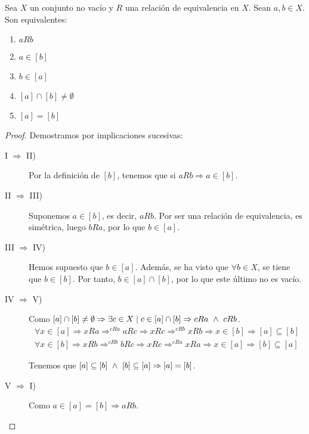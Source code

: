 \begin{prop}
    Sea $X$ un conjunto no vacío y $R$ una relación de equivalencia en $X$. Sean $a,b \in X$. Son
    equivalentes:
    \begin{enumerate}[label=\roman*.]
        \item $aRb$
        \item $a \in [b]$
        \item $b \in [a]$
        \item $[a] \cap [b] \neq \emptyset$
        \item $[a] = [b]$
    \end{enumerate}
\end{prop}
\begin{proof} Demostramos por implicaciones sucesivas:
\begin{description}
    \item [I $\Longrightarrow$ II)] Por la definición de $[b]$, tenemos que si $aRb \Rightarrow a \in [b]$.

    \item [II $\Longrightarrow$ III)] Suponemos $a \in [b]$, es decir, $ aRb$. Por ser una relación de equivalencia, es simétrica, luego $bRa$, por lo que $b \in [a]$.
    
    \item [III $\Longrightarrow$ IV)] Hemos supuesto que $b\in [a]$. Además, se ha visto que $\forall b\in X$, se tiene que $b\in [b]$. Por tanto, $b\in [a]\cap [b]$, por lo que este último no es vacío.
    
    \item [IV $\Longrightarrow$ V)]
    Como $[a] \cap [b] \neq \emptyset \Rightarrow \exists c \in X \mid c \in [a] \cap [b] \Rightarrow cRa \ \land \  cRb$.
    \begin{gather*}
        \forall x \in [a] \Rightarrow xRa \mathop{\Rightarrow}^{cRa} aRc \Rightarrow xRc \mathop{\Rightarrow}^{cRb} xRb \Rightarrow x \in [b] \Rightarrow [a] \subseteq [b] \\
        \forall x \in [b] \Rightarrow xRb \mathop{\Rightarrow}^{cRb} bRc \Rightarrow xRc
        \mathop{\Rightarrow}^{cRa} xRa \Rightarrow x \in [a] \Rightarrow [b] \subseteq [a]
    \end{gather*}

    Tenemos que $[a] \subseteq [b] \ \land \  [b] \subseteq [a] \Rightarrow [a] = [b]$.
    
    \item [V $\Longrightarrow$ I)] Como $a \in [a] = [b] \Rightarrow aRb$. \qedhere
\end{description}
\end{proof}

